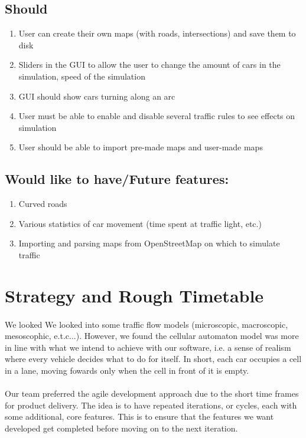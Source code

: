 \documentclass[11pt, a4paper]{article}
\begin{document}
\subsection{Should} 
\begin{enumerate}[itemsep = -1ex]
\item User can create their own maps (with roads, intersections) and save them to disk
\item Sliders in the GUI to allow the user to change the amount of cars in the simulation, speed of the simulation
\item GUI should show cars turning along an arc
\item User must be able to enable and disable several traffic rules to see effects on simulation
\item User should be able to import pre-made maps and user-made maps
\end{enumerate}

\subsection{Would like to have/Future features:}
\begin{enumerate}[itemsep = -1ex]
\item Curved roads
\item Various statistics of car movement (time spent at traffic light, etc.)
\item Importing and parsing maps from OpenStreetMap on which to simulate traffic
\end{enumerate}

\section{Strategy and Rough Timetable} 
\paragraph{}
We looked We looked into some traffic flow models (microscopic, macroscopic, mesoscophic, e.t.c...). However, we found the cellular automaton model was more in line with what we intend to achieve with our software, i.e. a sense of realism where every vehicle decides what to do for itself. In short, each car occupies a cell in a lane, moving fowards only when the cell in front of it is empty.
\paragraph{}
Our team preferred the agile development approach due to the short time frames for product delivery. The idea is to have repeated iterations, or cycles, each with some additional, core features. This is to ensure that the features we want developed get completed before moving on to the next iteration.
\end{document}
